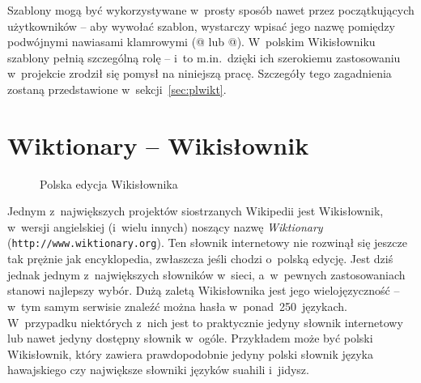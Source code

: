 \documentclass{pracamgr}
\newenvironment{illustration}[0]{
	\begin{figure}[h]
	\begin{center}
}{
	\end{center}
	\end{figure}
}
\begin{document}
Szablony mogą być wykorzystywane w~prosty sposób nawet przez początkujących użytkowników -- aby wywołać szablon, wystarczy wpisać jego nazwę
 pomiędzy podwójnymi nawiasami klamrowymi (@ lub @). W~polskim Wikisłowniku szablony pełnią szczególną rolę -- i~to m.in.\ dzięki ich szerokiemu zastosowaniu w~projekcie zrodził się pomysł na niniejszą pracę. Szczegóły tego zagadnienia zostaną przedstawione w~sekcji~\ref{sec:plwikt}.

\section{Wiktionary -- Wikisłownik}
\begin{illustration}
	\caption{Polska edycja Wikisłownika}
\end{illustration}
Jednym z~największych projektów siostrzanych Wikipedii jest Wikisłownik, w~wersji angielskiej (i~wielu innych) noszący nazwę \emph{Wiktionary} (\texttt{http://www.wiktionary.org}). Ten słownik internetowy nie rozwinął się jeszcze tak prężnie jak encyklopedia, zwłaszcza jeśli chodzi o~polską edycję. Jest dziś jednak jednym z~największych słowników w~sieci, a~w~pewnych zastosowaniach stanowi najlepszy wybór. Dużą zaletą Wikisłownika jest jego wielojęzyczność -- w~tym samym serwisie znaleźć można hasła w~ponad~250~językach. W~przypadku niektórych z~nich jest to praktycznie jedyny słownik internetowy lub nawet jedyny dostępny słownik w~ogóle. Przykładem może być polski Wikisłownik, który zawiera prawdopodobnie jedyny polski słownik języka hawajskiego czy największe słowniki języków suahili i~jidysz. %
\end{document}
